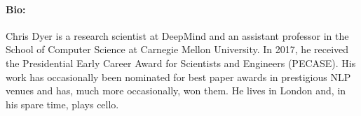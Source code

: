 \documentclass[11pt]{article}
\begin{document}
\paragraph{Bio:} Chris Dyer is a research scientist at DeepMind and an assistant professor in the School of Computer Science at Carnegie Mellon University. In 2017, he received the Presidential Early Career Award for Scientists and Engineers (PECASE). His work has occasionally been nominated for best paper awards in prestigious NLP venues and has, much more occasionally, won them. He lives in London and, in his spare time, plays cello.
\end{document}
